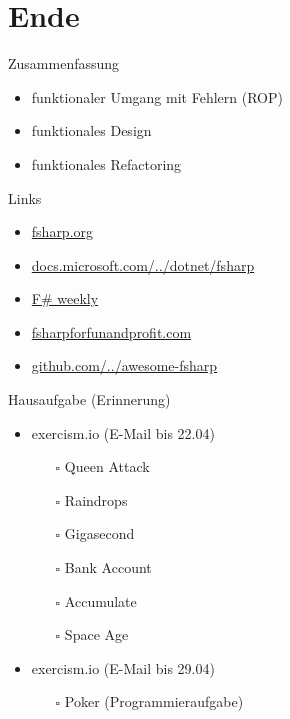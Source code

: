 \documentclass[t]{beamer}
\begin{document}
\section{Ende }
\label{sec:orge3bd3d3}
\begin{frame}[label={sec:org0e30a04}]{Zusammenfassung}
\begin{itemize}
\item funktionaler Umgang mit Fehlern (ROP)
\item funktionales Design
\item funktionales Refactoring
\end{itemize}
\end{frame}

\begin{frame}[label={sec:org29f2505}]{Links}
\begin{itemize}
\item \href{https://fsharp.org/}{fsharp.org}
\item \href{https://docs.microsoft.com/de-de/dotnet/fsharp/}{docs.microsoft.com/../dotnet/fsharp}
\item \href{https://sergeytihon.com/}{F\# weekly}
\item \href{https://fsharpforfunandprofit.com/}{fsharpforfunandprofit.com}
\item \href{https://github.com/fsprojects/awesome-fsharp}{github.com/../awesome-fsharp}
\end{itemize}
\end{frame}

\begin{frame}[label={sec:org7a628ce}]{Hausaufgabe (Erinnerung)}
\begin{itemize}
\item exercism.io (E-Mail bis 22.04)
\begin{itemize}
\item[{$\square$}] Queen Attack
\item[{$\square$}] Raindrops
\item[{$\square$}] Gigasecond
\item[{$\square$}] Bank Account
\item[{$\square$}] Accumulate
\item[{$\square$}] Space Age
\end{itemize}

\item exercism.io (E-Mail bis 29.04)
\begin{itemize}
\item[{$\square$}] Poker (Programmieraufgabe)
\end{itemize}
\end{itemize}
\end{frame}
\end{document}
